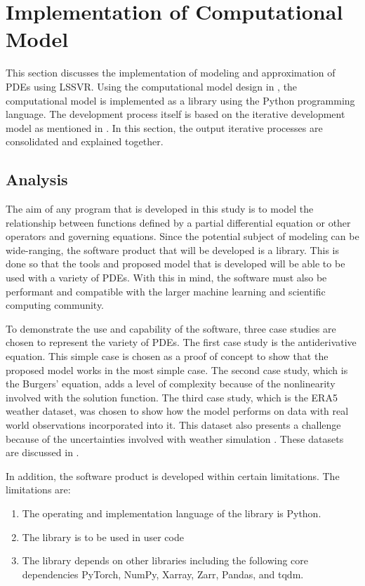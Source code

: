\section{Implementation of Computational Model}
\noindent This section discusses the implementation of modeling and approximation of PDEs using LSSVR\@. Using the computational model design in , the computational model is implemented as a library using the Python programming language. The development process itself is based on the iterative development model as mentioned in . In this section, the output iterative processes are consolidated and explained together.

\subsection{Analysis}
\noindent The aim of any program that is developed in this study is to model the relationship between functions defined by a partial differential equation or other operators and governing equations. Since the potential subject of modeling can be wide-ranging, the software product that will be developed is a library. This is done so that the tools and proposed model that is developed will be able to be used with a variety of PDEs. With this in mind, the software must also be performant and compatible with the larger machine learning and scientific computing community.

To demonstrate the use and capability of the software, three case studies are chosen to represent the variety of PDEs. The first case study is the antiderivative equation. This simple case is chosen as a proof of concept to show that the proposed model works in the most simple case. The second case study, which is the Burgers' equation, adds a level of complexity because of the nonlinearity involved with the solution function. The third case study, which is the ERA5 weather dataset, was chosen to show how the model performs on data with real world observations incorporated into it. This dataset also presents a challenge because of the uncertainties involved with weather simulation \autocite{herreraReviewCurrentFuture2017}. These datasets are discussed in .

In addition, the software product is developed within certain limitations. The limitations are:
\begin{enumerate}
  \item The operating and implementation language of the library is Python.
  \item The library is to be used in user code
  \item The library depends on other libraries including the following core dependencies PyTorch, NumPy, Xarray, Zarr, Pandas, and tqdm.
\end{enumerate}


